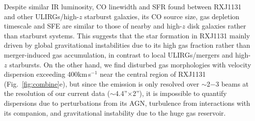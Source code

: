 \documentclass[11pt,a4paper,twoside,graphicx,color]{article}
\newcommand{\kms}{km\,s$^{-1}$\xspace}
\newcommand{\Fig}[1]{Fig.~\ref{fig:#1}}
\newcommand{\SF}{star formation\xspace}
\newcommand{\SB}{starburst\xspace}
\newcommand{\highz}{high-$z$\xspace}
\begin{document}
Despite similar IR luminosity, CO linewidth and SFR found between RXJ1131
and other ULIRGs/high-$z$ \SB galaxies,
its CO source size, gas depletion timescale and SFE are similar to those
of nearby and high-$z$ disk galaxies rather than \SB systems. This suggests that
the \SF in RXJ1131
mainly driven by
global gravitational instabilities due to its high gas fraction
rather than merger-induced gas accumulation,
in contrast to local ULIRGs/mergers and \highz starbursts.
On the other hand, we find disturbed gas morphologies with velocity dispersion exceeding
400\kms near the central region of RXJ1131 (\Fig{combine}e), but since
the emission is only resolved over $\sim$2$-$3 beams at the resolution of our current data ($\sim$4.4''$\times$2''),
it is impossible to quantify dispersions due to
perturbations from its AGN,
turbulence from interactions with its companion,
and gravitational instability due to the huge gas reservoir. %
\end{document}

